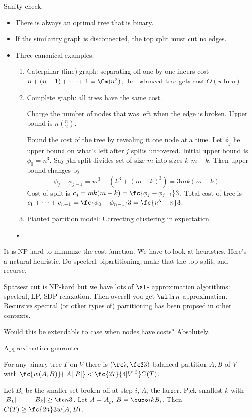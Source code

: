 Sanity check: 
\begin{itemize}
\item
There is always an optimal tree that is binary. 
\item
If the similarity graph is disconnected, the top split must cut no edges.
\item
Three canonical examples:
\begin{enumerate}
\item
Caterpillar (line) graph: separating off one by one incurs cost $n+(n-1)+\cdots + 1 = \Om(n^2)$; the balanced tree gets cost $O(n\ln n)$.
\item
Complete graph: all trees have the same cost. 

Charge the number of nodes that was left when the edge is broken. Upper bound is $n\binom n2$. 

Bound the cost of the tree by revealing it one node at a time. Let $\phi_j$ be upper bound on what's left after $j$ splits uncovered. Initial upper bound is $\phi_0=n^3$. 
Say $j$th split divides set of size $m$ into sizes $k,m-k$. 
Then upper bound changes by 
$$
\phi_j - \phi_{j-1} = m^3 - (k^3 + (m-k)^3) = 3mk(m-k).
$$
Cost of split is $c_j = mk(m-k) = \fc{\phi_j-\phi_{j-1}}3$. Total cost of tree is $c_1+\cdots +c_{n-1} = \fc{\phi_0-\phi_{n-1}}3 = \fc{n^3-n}3$.
\item
Planted partition model: Correcting clustering in expectation.
\end{enumerate}•
\end{itemize}
It is NP-hard to minimize the cost function. We have to look at heuristics. Here's a natural heuristic. Do spectral bipartitioning, make that the top split, and recurse. 

Sparsest cut is NP-hard but we have lots of $\al$- approximation algorithms: spectral, LP, SDP relaxation. Then overall you get $\al\ln n$ approximation. 
Recursive spectral (or other types of) partitioning has been propsed in other contexts. 

Would this be extendable to case when nodes have costs? Absolutely.

Approximation guarantee. 
\begin{lem}
For any binary tree $T$ on $V$ there is $(\rc 3, \fc 23)$-balanced partition $A,B$ of $V$ with $\fc{w(A,B)}{|A||B|}< \fc{27}{4|V|^3}C(T)$. 
\end{lem}
Let $B_i$ be the smaller set broken off at step $i$, $A_i$ the larger. 
Pick smallest $k$ with $|B_1|+\cdots |B_k|\ge \fc n3$.
Let $A=A_k$, $B=\cupo ik B_i$. Then $C(T) \ge \fc{2n}3 w(A,B)$. 

